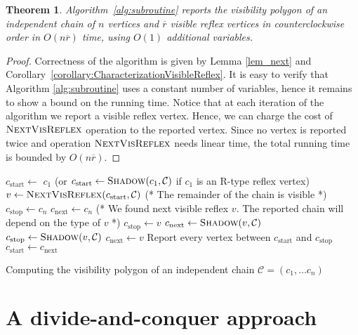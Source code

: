\documentclass[a4paper]{article}
\newtheorem{theorem}{Theorem}
\newcommand{\C}{\ensuremath{{\mathcal C}}}
\begin{document}
\begin{theorem}\label{theo:Sequential algorithm}
Algorithm~\ref{alg:subroutine} reports the visibility polygon of an independent chain of $n$ vertices and $\overline{r}$ visible reflex vertices in counterclockwise order in $O(n\overline{r})$ time, using $O(1)$ additional variables.
\end{theorem}
\begin{proof}
Correctness of the algorithm is given by Lemma \ref{lem_next} and Corollary~\ref{corollary:CharacterizationVisibleReflex}.  It is easy to verify that Algorithm \ref{alg:subroutine} uses a constant number of variables, hence it remains to show a bound on the running time. Notice that at each iteration of the algorithm we report a visible reflex vertex. Hence, we can charge the cost of $\textsc{NextVisReflex}$ operation to the reported vertex. Since no vertex is reported twice and operation $\textsc{NextVisReflex}$ needs linear time, the total running time is bounded by $O(n\overline{r})$. 
\end{proof}

\begin{algorithm}
  \begin{algorithmic}[1]  
	\STATE $c_{\mathrm{start}} \leftarrow$ $c_1$ (or $c_{\mathrm{start}}\gets \textsc{Shadow}(c_1,\C)$ if $c_1$ is an R-type reflex vertex)
	\REPEAT
		\STATE $v\gets  \textsc{NextVisReflex}(c_{\mathrm{start}},\C)$
			\STATE  (*  The remainder of the chain is visible *)
			\STATE $c_{\mathrm{stop}} \gets c_n$
			\STATE $c_{\mathrm{next}}\gets c_n$
		\ELSE 
		        \STATE (* We found next visible reflex $v$. The reported chain will depend on the type of $v$ *)
				\STATE $c_{\mathrm{stop}} \gets v$
				\STATE $c_{\mathrm{next}}\gets \textsc{Shadow}(v,\C)$
			\ELSE
				\STATE $c_{\mathrm{stop}} \gets \textsc{Shadow}(v,\C)$
				\STATE $c_{\mathrm{next}}\gets v$
			\ENDIF
		\ENDIF
    \STATE Report every vertex between $c_{\mathrm{start}}$ and $c_{\mathrm{stop}}$
    \STATE $c_{\mathrm{start}}\gets c_{\mathrm{next}}$
  \end{algorithmic}
\caption{Computing the visibility polygon of an independent chain $\C=(c_1,\ldots c_n)$}
\label{alg:subroutine}
\end{algorithm}

\section{A divide-and-conquer approach}\label{Section:Divide and conquer}
\end{document}
